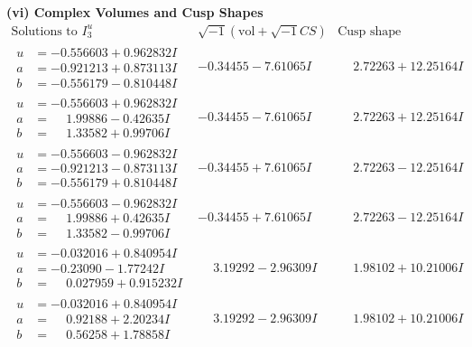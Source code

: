\documentclass[1p]{elsarticle_modified}
\theoremstyle{definition}
\newcommand{\I}{\sqrt{-1}}
\begin{document}
\newpage\flushleft \textbf{(vi) Complex Volumes and Cusp Shapes}
$$\begin{array}{c|c|c}  
\text{Solutions to }I^u_{3}& \I (\text{vol} + \sqrt{-1}CS) & \text{Cusp shape}\\
 \hline 
\begin{aligned}
u &= -0.556603 + 0.962832 I \\
a &= -0.921213 + 0.873113 I \\
b &= -0.556179 - 0.810448 I\end{aligned}
 & -0.34455 - 7.61065 I & \phantom{-}2.72263 + 12.25164 I \\ \hline\begin{aligned}
u &= -0.556603 + 0.962832 I \\
a &= \phantom{-}1.99886 - 0.42635 I \\
b &= \phantom{-}1.33582 + 0.99706 I\end{aligned}
 & -0.34455 - 7.61065 I & \phantom{-}2.72263 + 12.25164 I \\ \hline\begin{aligned}
u &= -0.556603 - 0.962832 I \\
a &= -0.921213 - 0.873113 I \\
b &= -0.556179 + 0.810448 I\end{aligned}
 & -0.34455 + 7.61065 I & \phantom{-}2.72263 - 12.25164 I \\ \hline\begin{aligned}
u &= -0.556603 - 0.962832 I \\
a &= \phantom{-}1.99886 + 0.42635 I \\
b &= \phantom{-}1.33582 - 0.99706 I\end{aligned}
 & -0.34455 + 7.61065 I & \phantom{-}2.72263 - 12.25164 I \\ \hline\begin{aligned}
u &= -0.032016 + 0.840954 I \\
a &= -0.23090 - 1.77242 I \\
b &= \phantom{-}0.027959 + 0.915232 I\end{aligned}
 & \phantom{-}3.19292 - 2.96309 I & \phantom{-}1.98102 + 10.21006 I \\ \hline\begin{aligned}
u &= -0.032016 + 0.840954 I \\
a &= \phantom{-}0.92188 + 2.20234 I \\
b &= \phantom{-}0.56258 + 1.78858 I\end{aligned}
 & \phantom{-}3.19292 - 2.96309 I & \phantom{-}1.98102 + 10.21006 I \\ \hline\begin{aligned}

\end{aligned}
\end{array}$$
\end{document}
